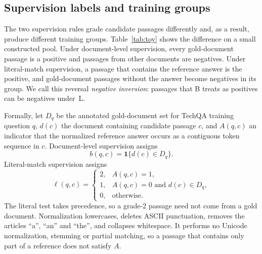 \subsection{Supervision labels and training groups}\label{sec:labels}
The two supervision rules grade candidate passages differently and, as a result, produce different training groups. Table~\ref{tab:toy} shows the difference on a small constructed pool. Under document-level supervision, every gold-document passage is a positive and passages from other documents are negatives. Under literal-match supervision, a passage that contains the reference answer is the positive, and gold-document passages without the answer become negatives in its group. We call this reversal \emph{negative inversion}: passages that B treats as positives can be negatives under~L.

Formally, let $D_q$ be the annotated gold-document set for TechQA training question $q$, $d(c)$ the document containing candidate passage $c$, and $A(q,c)$ an indicator that the normalized reference answer occurs as a contiguous token sequence in $c$. Document-level supervision assigns
\begin{equation}
 b(q,c)=\mathbf{1}\{d(c)\in D_q\}.
\end{equation}
Literal-match supervision assigns
\begin{equation}
 \ell(q,c)=\begin{cases}2,&A(q,c)=1,\\1,&A(q,c)=0\text{ and }d(c)\in D_q,\\0,&\text{otherwise}.\end{cases}
\end{equation}
The literal test takes precedence, so a grade-2 passage need not come from a gold document. Normalization lowercases, deletes ASCII punctuation, removes the articles ``a'', ``an'' and ``the'', and collapses whitespace. It performs no Unicode normalization, stemming or partial matching, so a passage that contains only part of a reference does not satisfy $A$.
